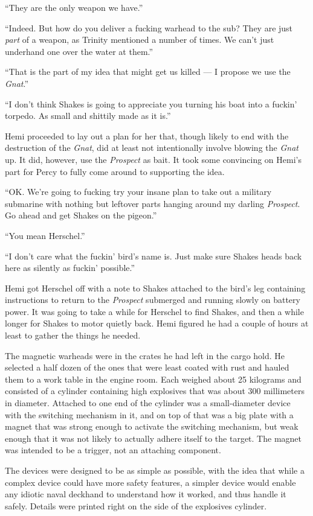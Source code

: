 \documentclass[
]{scrbook}
\begin{document}
``They are the only weapon we have.''

``Indeed. But how do you deliver a fucking warhead to the sub? They are
just \emph{part} of a weapon, as Trinity mentioned a number of times. We
can't just underhand one over the water at them.''

``That is the part of my idea that might get us killed --- I propose we
use the \emph{Gnat}.''

``I don't think Shakes is going to appreciate you turning his boat into
a fuckin' torpedo. As small and shittily made as it is.''

Hemi proceeded to lay out a plan for her that, though likely to end with
the destruction of the \emph{Gnat}, did at least not intentionally
involve blowing the \emph{Gnat} up. It did, however, use the
\emph{Prospect} as bait. It took some convincing on Hemi's part for
Percy to fully come around to supporting the idea.

``OK. We're going to fucking try your insane plan to take out a military
submarine with nothing but leftover parts hanging around my darling
\emph{Prospect}. Go ahead and get Shakes on the pigeon.''

``You mean Herschel.''

``I don't care what the fuckin' bird's name is. Just make sure Shakes
heads back here as silently as fuckin' possible.''

Hemi got Herschel off with a note to Shakes attached to the bird's leg
containing instructions to return to the \emph{Prospect} submerged and
running slowly on battery power. It was going to take a while for
Herschel to find Shakes, and then a while longer for Shakes to motor
quietly back. Hemi figured he had a couple of hours at least to gather
the things he needed.

The magnetic warheads were in the crates he had left in the cargo hold.
He selected a half dozen of the ones that were least coated with rust
and hauled them to a work table in the engine room. Each weighed about
25 kilograms and consisted of a cylinder containing high explosives that
was about 300 millimeters in diameter. Attached to one end of the
cylinder was a small-diameter device with the switching mechanism in it,
and on top of that was a big plate with a magnet that was strong enough
to activate the switching mechanism, but weak enough that it was not
likely to actually adhere itself to the target. The magnet was intended
to be a trigger, not an attaching component.

The devices were designed to be as simple as possible, with the idea
that while a complex device could have more safety features, a simpler
device would enable any idiotic naval deckhand to understand how it
worked, and thus handle it safely. Details were printed right on the
side of the explosives cylinder.
\end{document}
